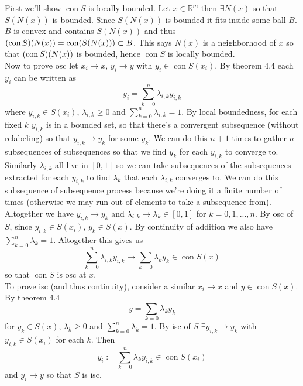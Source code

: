 \documentclass{article}
\newenvironment{ex}[1]
  {\renewcommand\theexercise{#1}\exercise}
  {\endexercise}
\DeclareMathOperator*{\con}{con}
\newcommand{\R}[1]{\mathbb{R}^{#1}}
\begin{document}
\begin{ex}{4.18} %
  First we'll show $\con S$ is locally bounded. Let $x \in \R{m}$ then $\exists N(x)$ so that $S(N(x))$ is bounded. Since $S(N(x))$ is bounded it fits inside some ball $B$. $B$ is convex and contains $S(N(x))$ and thus $\parens{ \con S }(N(x)) = \con (S(N(x))) \subset B$. This says $N(x)$ is a neighborhood of $x$ so that $\parens{\con S}(N(x))$ is bounded, hence $\con S$ is locally bounded. \, \\

  Now to prove osc let $x_i \to x$, $y_i \to y$ with $y_i \in \con S(x_i)$. By theorem 4.4 each $y_i$ can be written as
  $$
  y_i = \sum_{k=0}^n \lambda_{i,k} y_{i,k}
  $$
  where $y_{i, k} \in S(x_i)$, $\lambda_{i,k} \ge 0$ and $\sum_{k=0}^n \lambda_{i,k} = 1$. By local boundedness, for each fixed $k$ $y_{i,k}$ is in a bounded set, so that there's a convergent subsequence (without relabeling) so that $y_{i,k} \to y_k$ for some $y_k$. We can do this $n+1$ times to gather $n$ subsequences of subsequences so that we find $y_k$ for each $y_{i,k}$ to converge to. Similarly $\lambda_{i,k}$ all live in $[0, 1]$ so we can take subsequences of the subsequences extracted for each $y_{i,k}$ to find $\lambda_k$ that each $\lambda_{i,k}$ converges to. We can do this subsequence of subsequence process because we're doing it a finite number of times (otherwise we may run out of elements to take a subsequence from). Altogether we have $y_{i,k} \to y_k$ and $\lambda_{i,k} \to \lambda_k \in [0,1]$ for $k = 0, 1, ..., n$. By osc of $S$, since $y_{i,k} \in S(x_i)$, $y_k \in S(x)$. By continuity of addition we also have $\sum_{k=0}^n \lambda_k = 1$. Altogether this gives us
  $$
  \sum_{k=0}^n \lambda_{i,k} y_{i,k} \to \sum_{k=0} \lambda_k y_k \in \con S(x)
  $$
  so that $\con S$ is osc at $x$. \, \\

  To prove isc (and thus continuity), consider a similar $x_i \to x$ and $y \in \con S(x)$. By theorem 4.4
  $$
  y = \sum_{k=0} \lambda_k y_k
  $$
  for $y_k \in S(x)$, $\lambda_k \ge 0$ and $\sum_{k=0}^n \lambda_k = 1$. By isc of $S$ $\exists y_{i,k} \to y_k$ with $y_{i,k} \in S(x_i)$ for each $k$. Then
  $$
  y_i := \sum_{k=0}^n \lambda_k y_{i,k} \in \con S(x_i)
  $$
  and $y_i \to y$ so that $S$ is isc.
\end{ex} %
\end{document}

